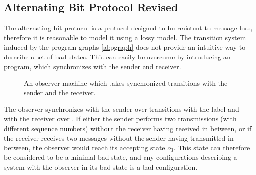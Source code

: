 \subsection{Alternating Bit Protocol Revised}
The alternating bit protocol is a protocol designed to be resistent to message loss, therefore it is reasonable to model it using a lossy model. The transition system induced by the program graphs \ref{abpgraph} does not provide an intuitive way to describe a set  of bad states. This can easily be overcome by introducing an  program, which synchronizes with the sender and receiver.

\begin{figure}[h!]
\caption{An observer machine which takes synchronized transitions with the sender and the receiver.}
\label{abpobserver}
\abpobserver

\end{figure}

The observer synchronizes with the sender over transitions with the label  and with the receiver over . If either the sender performs two transmissions (with different sequence numbers) without the receiver having received in between, or if the receiver receives two messages without the sender having transmitted in between, the observer would reach its accepting state $o_3$. This state can therefore be considered to be a minimal bad state, and any configurations describing a system with the observer in its bad state is a bad configuration.
